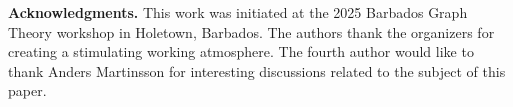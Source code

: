 \documentclass[english,11pt]{article}
\theoremstyle{definition}
\numberwithin{equation}{section}
\numberwithin{figure}{section}
\begin{document}
\bigskip

\textbf{Acknowledgments.} This work was initiated at the 2025 Barbados Graph Theory workshop in Holetown, Barbados. The authors thank the organizers for creating a stimulating working atmosphere. The fourth author would like to thank Anders Martinsson for interesting discussions related to the subject of this paper.


\providecommand{\MR}[1]{}
\providecommand{\MRhref}[2]{%
\href{http://www.ams.org/mathscinet-getitem?mr=#1}{#2}}

  
  
\end{document}
